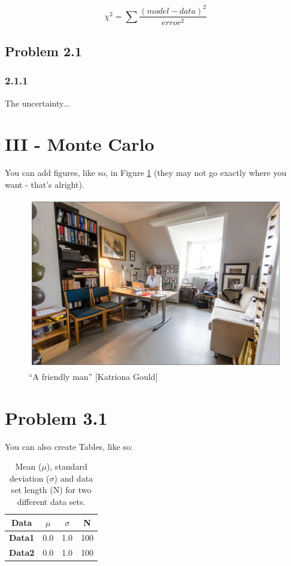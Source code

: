 \documentclass{article}
\begin{document}
\begin{equation}
    \chi ^{2} = \sum \frac{(model-data)^{2}}{error^{2}}
    \label{eq1}
\end{equation}

\subsection*{Problem 2.1}
\subsubsection*{2.1.1} The uncertainty...



\section*{III - Monte Carlo}
You can add figures, like so, in Figure \ref{fig1} (they may not go exactly where you want - that's alright). 

\begin{figure}[h]
    \centering
    \includegraphics[scale=0.25]{Troels_InOffice.jpg}
    \caption{``A friendly man'' [Katriona Gould]}
    \label{fig1}
\end{figure}

\section*{Problem 3.1}
You can also create Tables, like so: 

\begin{table}[hbtp!]
\begin{centering}
\begin{tabular}{ |c|c|c|c| } 
  \hline
  Data & $\mu$ & $\sigma$ & N\\ 
  \hline 
  \textbf{Data1} & 0.0 & 1.0 & 100 \\ 
  \textbf{Data2} & 0.0 & 1.0 & 100 \\ 
  \hline
\end{tabular}
\caption{Mean ($\mu$), standard deviation ($\sigma$) and data set length (N) for two different data sets.}
\label{tab:cleaned}
\end{centering}
\end{table}
\end{document}
